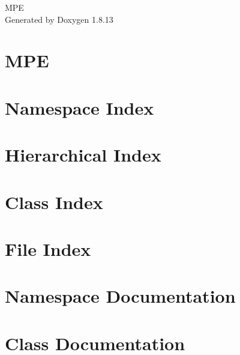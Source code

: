 \documentclass[twoside]{book}
\newcommand{\+}{\discretionary{\mbox{\scriptsize$\hookleftarrow$}}{}{}}
\newcommand{\clearemptydoublepage}{%
  \newpage{\pagestyle{empty}\cleardoublepage}%
}
\begin{document}
\hypersetup{pageanchor=false,
             bookmarksnumbered=true,
             pdfencoding=unicode
            }
\begin{titlepage}
\vspace*{7cm}
\begin{center}%
{\Large M\+PE }\\
\vspace*{1cm}
{\large Generated by Doxygen 1.8.13}\\
\end{center}
\end{titlepage}
\clearemptydoublepage
{}
\tableofcontents
\clearemptydoublepage
{}
\hypersetup{pageanchor=true}

\chapter{M\+PE}
\label{md__c_1__users__walter__source__repos__m_p_e__r_e_a_d_m_e}

\chapter{Namespace Index}

\chapter{Hierarchical Index}

\chapter{Class Index}

\chapter{File Index}

\chapter{Namespace Documentation}



\chapter{Class Documentation}

















\end{document}
